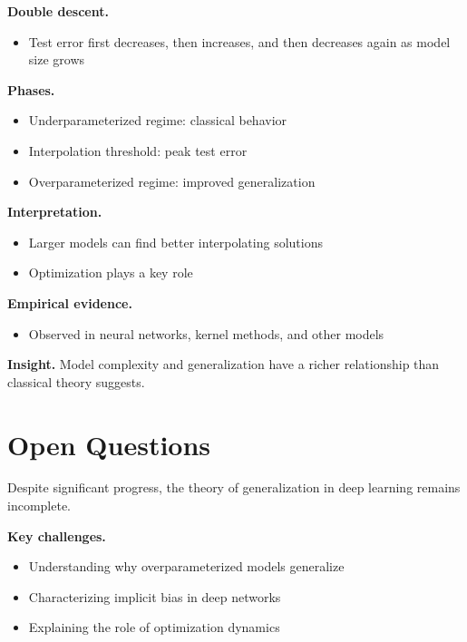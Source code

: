 \medskip

\noindent
\textbf{Double descent.}
\begin{itemize}
    \item Test error first decreases, then increases, and then decreases again as model size grows
\end{itemize}

\medskip

\noindent
\textbf{Phases.}
\begin{itemize}
    \item Underparameterized regime: classical behavior
    \item Interpolation threshold: peak test error
    \item Overparameterized regime: improved generalization
\end{itemize}

\medskip

\noindent
\textbf{Interpretation.}
\begin{itemize}
    \item Larger models can find better interpolating solutions
    \item Optimization plays a key role
\end{itemize}

\medskip

\noindent
\textbf{Empirical evidence.}
\begin{itemize}
    \item Observed in neural networks, kernel methods, and other models
\end{itemize}

\medskip

\noindent
\textbf{Insight.}  
Model complexity and generalization have a richer relationship than classical theory suggests.

\section{Open Questions}

Despite significant progress, the theory of generalization in deep learning remains incomplete.

\medskip

\noindent
\textbf{Key challenges.}
\begin{itemize}
    \item Understanding why overparameterized models generalize
    \item Characterizing implicit bias in deep networks
    \item Explaining the role of optimization dynamics
\end{itemize}

